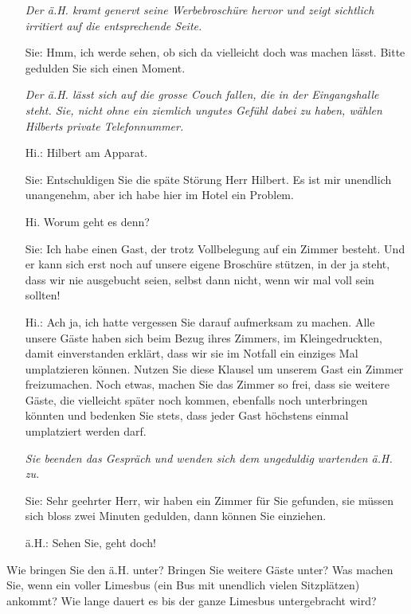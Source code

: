 \begin{example}
\begin{itemize}
\textit{Der ä.H. kramt genervt seine Werbebroschüre hervor und zeigt sichtlich irritiert auf die entsprechende Seite.}
\item[Sie:] Hmm, ich werde sehen, ob sich da vielleicht doch was machen lässt. Bitte gedulden Sie sich einen Moment.

\textit{Der ä.H. lässt sich auf die grosse Couch fallen, die in der Eingangshalle steht. Sie, nicht ohne ein ziemlich ungutes Gefühl dabei zu haben, wählen Hilberts private Telefonnummer.}
\item[Hi.:] Hilbert am Apparat.
\item[Sie:] Entschuldigen Sie die späte Störung Herr Hilbert. Es ist mir unendlich unangenehm, aber ich habe hier im Hotel ein Problem.
\item[Hi.] Worum geht es denn?
\item[Sie:] Ich habe einen Gast, der trotz Vollbelegung auf ein Zimmer besteht. Und er kann sich erst noch auf unsere eigene Broschüre stützen, in der ja steht, dass wir nie ausgebucht seien, selbst dann nicht, wenn wir mal voll sein sollten!
\item[Hi.:] Ach ja, ich hatte vergessen Sie darauf aufmerksam zu machen. Alle unsere Gäste haben sich beim Bezug ihres Zimmers, {\tiny im Kleingedruckten}, damit einverstanden erklärt, dass wir sie im Notfall ein einziges Mal umplatzieren können. Nutzen Sie diese Klausel um unserem Gast ein Zimmer freizumachen. Noch etwas, machen Sie das Zimmer so frei, dass sie weitere Gäste, die vielleicht später noch kommen, ebenfalls noch unterbringen könnten und bedenken Sie stets, dass jeder Gast höchstens einmal umplatziert werden darf.

\textit{Sie beenden das Gespräch und wenden sich dem ungeduldig wartenden ä.H. zu.}
\item[Sie:] Sehr geehrter Herr, wir haben ein Zimmer für Sie gefunden, sie müssen sich bloss zwei Minuten gedulden, dann können Sie einziehen.
\item[ä.H.:] Sehen Sie, geht doch!
\end{itemize}
Wie bringen Sie den ä.H. unter? Bringen Sie weitere Gäste unter? Was machen Sie, wenn ein voller Limesbus (ein Bus mit unendlich vielen Sitzplätzen) ankommt? Wie lange dauert es bis der ganze Limesbus untergebracht wird?
\end{example}

